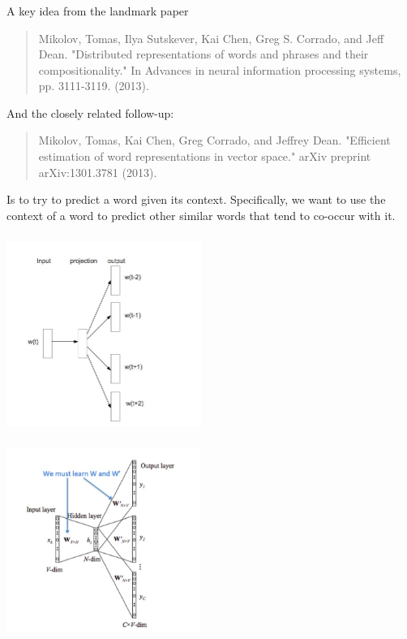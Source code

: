 \documentclass[xetex,mathserif,serif,aspectratio=169]{beamer}
\begin{document}
\begin{frame}[fragile] \frametitle{} \oldB \small


A key idea from the landmark paper
\begin{quote}
Mikolov, Tomas, Ilya Sutskever, Kai Chen, Greg S. Corrado, and
Jeff Dean. "Distributed representations of words and phrases
and their compositionality." In Advances in neural information
processing systems, pp. 3111-3119. (2013).
\end{quote}
And the closely related follow-up:
\begin{quote}
Mikolov, Tomas, Kai Chen, Greg Corrado, and Jeffrey Dean.
"Efficient estimation of word representations in vector space."
arXiv preprint arXiv:1301.3781 (2013).
\end{quote}
Is to try to predict a word given its context. Specifically, we
want to use the context of a word to predict other similar
words that tend to co-occur with it.

\end{frame}

\begin{frame}[fragile] \frametitle{} \oldB \small

\begin{center}
\includegraphics[height=6cm]{img/skipGram.jpg}
\end{center}

\end{frame}

\begin{frame}[fragile] \frametitle{} \oldB \small

\begin{center}
\includegraphics[height=6cm]{img/skipGram2.jpg}
\end{center}

\end{frame}
\end{document}
